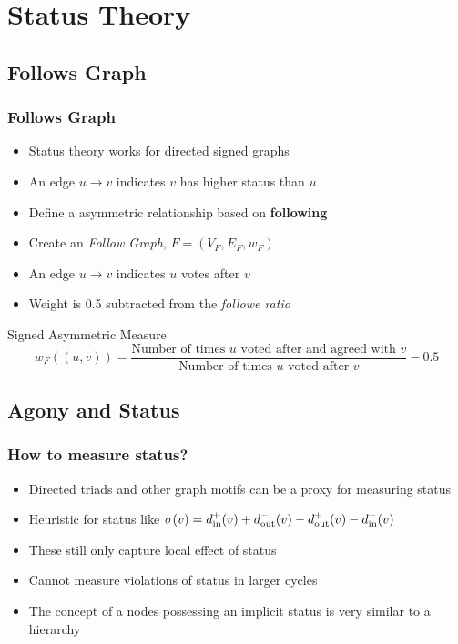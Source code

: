 \documentclass{beamer}
\begin{document}
\section{Status Theory}


\subsection{Follows Graph}

\begin{frame}
    \frametitle{Follows Graph}
    \begin{itemize}
        \item Status theory works for directed signed graphs
        \item An edge $u\rightarrow v$ indicates $v$ has higher status than $u$
        \item Define a asymmetric relationship based on \textbf{following} 
        \item Create an \textit{Follow Graph}, $F=(V_F,E_F,w_F)$
        \item An edge $u \rightarrow v$ indicates $u$ votes after $v$
        \item Weight is 0.5 subtracted from the \textit{followe ratio}
    \end{itemize}
    \begin{block}{Signed Asymmetric Measure}
        $$ w_{F}((u,v)) = \frac{\text{Number of times } u \text{ voted after and agreed with } v }{\text{Number of times } u \text{ voted after } v} -0.5$$
    \end{block}

\end{frame}


\subsection{Agony and Status}

\begin{frame}
    \frametitle{How to measure status?}
    \begin{itemize}
        \item Directed triads and other graph motifs can be a proxy for measuring status \cite{Liu2019LinkPrediction}
        \item Heuristic for status like  $\sigma(v) = d_{\text{in}}^{+}(v) + d_{\text{out}}^{-}(v) - d_{\text{out}}^{+}(v)- d_{\text{in}}^{-}(v)$ \cite{leskovec2010predicting}
        \item These still only capture local effect of status
        \item Cannot measure violations of status in larger cycles
        \item The concept of a nodes possessing an implicit status is very similar to a hierarchy
    \end{itemize}
\end{frame}
\end{document}
